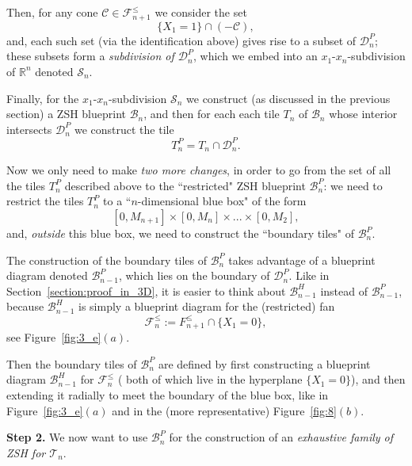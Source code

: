 \documentclass[12pt,letterpaper]{article}
\renewcommand{\S}{\mathcal{S}}
\newcommand{\C}{\mathcal{C}}
\newcommand{\T}{\mathcal{T}}
\newcommand{\B}{\mathcal{B}}
\newcommand{\D}{\mathcal{D}}
\newcommand{\F}{\mathcal{F}}
\newcommand{\RRn}{\mathbb{R}^n}
\begin{document}
Then, for any cone $\C \in \F_{n+1}^\le$ we consider the set 
$$
\{  X_1 = 1  \}   \cap   (-\C),
$$
and, each such set (via the identification above)  gives rise to a subset of $\D_n^P$; these subsets form a {\em subdivision of $\D_n^P$}, which we embed into an $x_1$-$x_n$-subdivision of $\RRn$ denoted $\S_n$. 

Finally, for the  $x_1$-$x_n$-subdivision  $\S_n$ we construct (as discussed in the previous section) a ZSH blueprint $\B_n$, and then for each each tile $T_n$  of $\B_n$ whose interior intersects $\D_n^P$ we construct the tile 
$$
T_n^P  =  T_n \cap \D_n^P.
$$

Now we only need to make {\em two more changes}, in order  to go  from the set of all the tiles $T_n^P$ described above to the  ``restricted" ZSH blueprint $\B_n^P$: we need to restrict the tiles $T_n^P$ to a ``$n$-dimensional blue box" of the form 
$$
[0, M_{n+1}] \times [0, M_n] \times ... \times [0, M_2], 
$$
and, {\em outside} this blue box, we need to construct the ``boundary tiles" of $\B_n^P$. 

The construction of the boundary tiles of $\B_n^P$ takes advantage of a blueprint diagram denoted $\B_{n-1}^P$, which lies on the boundary of $\D_n^P$. Like in Section~\ref{section:proof_in_3D}, it is easier to think about $\B_{n-1}^H$ instead of $\B_{n-1}^P$, because $\B_{n-1}^H$ is simply a blueprint diagram for the (restricted) fan 
$$
\F_n^\le := F_{n+1}^\le \cap \{ X_1 = 0 \},
$$
see Figure~\ref{fig:3_e}$(a)$. 

Then the boundary tiles of $\B_n^P$ are defined by first constructing a blueprint diagram  $\B_{n-1}^H$ for $\F_n^\le$ ( both of which   live in the hyperplane $\{ X_1 = 0 \}$), and then extending it radially to meet the boundary of the blue box, like in Figure~\ref{fig:3_e}$(a)$ and in the (more representative) Figure~\ref{fig:8}$(b)$. 





\bigskip 
\bigskip 
\bigskip 
\bigskip 
\bigskip 
\bigskip 
\bigskip 
\bigskip 





\bigskip 
\bigskip 
\bigskip 
\bigskip 
\bigskip 
\bigskip 

\noindent
{\bf Step 2.}  We now want to use  $\B_n^P$  for the construction of an {\em exhaustive family of ZSH for $\T_n$}. 

\end{document}
